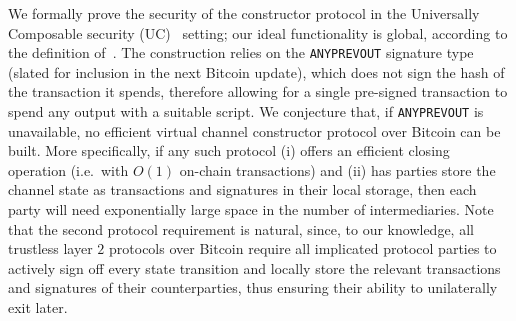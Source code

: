   We formally prove the security of the constructor protocol in the Universally
  Composable security (UC)~\cite{uc} setting; our ideal functionality is global,
  according to the definition of~\cite{DBLP:conf/tcc/BadertscherCHTZ20}. The
  construction relies on the \texttt{ANYPREVOUT} signature type (slated for
  inclusion in the next Bitcoin update), which does not sign the hash of the
  transaction it spends, therefore allowing for a single pre-signed transaction
  to spend any output with a suitable script. We conjecture that, if
  \texttt{ANYPREVOUT} is unavailable, no efficient virtual channel constructor
  protocol over Bitcoin can be built. More specifically, if any such protocol
  (i) offers an efficient closing operation (i.e.\ with $O(1)$ on-chain
  transactions) and (ii) has parties store the channel state as transactions and
  signatures in their local storage, then each party will need exponentially
  large space in the number of intermediaries. Note that the second protocol
  requirement is natural, since, to our knowledge, all trustless layer $2$
  protocols over Bitcoin require all implicated protocol parties to actively
  sign off every state transition and locally store the relevant transactions
  and signatures of their counterparties, thus ensuring their ability to
  unilaterally exit later.
